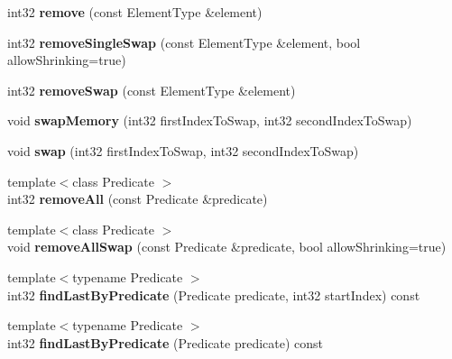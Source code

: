 \begin{DoxyCompactItemize}
int32 {\bfseries remove} (const Element\+Type \&element)
\item 
\mbox{\label{class_arcana_1_1_array_a849750b62acc0b3554d63dc2dbf7f382}} 
int32 {\bfseries remove\+Single\+Swap} (const Element\+Type \&element, bool allow\+Shrinking=true)
\item 
\mbox{\label{class_arcana_1_1_array_af950b1dd843709ce88930dec867e93db}} 
int32 {\bfseries remove\+Swap} (const Element\+Type \&element)
\item 
\mbox{\label{class_arcana_1_1_array_ac42d537277a747961d62b0e591d4391a}} 
void {\bfseries swap\+Memory} (int32 first\+Index\+To\+Swap, int32 second\+Index\+To\+Swap)
\item 
\mbox{\label{class_arcana_1_1_array_a5873c440c62d072d2bef2dec178ac447}} 
void {\bfseries swap} (int32 first\+Index\+To\+Swap, int32 second\+Index\+To\+Swap)
\item 
\mbox{\label{class_arcana_1_1_array_a88d753cbf13d4855581bf4873bbd35e6}} 
{\footnotesize template$<$class Predicate $>$ }\\int32 {\bfseries remove\+All} (const Predicate \&predicate)
\item 
\mbox{\label{class_arcana_1_1_array_a7a1dbc9cdd4b134a23dbb0703c40ed41}} 
{\footnotesize template$<$class Predicate $>$ }\\void {\bfseries remove\+All\+Swap} (const Predicate \&predicate, bool allow\+Shrinking=true)
\item 
\mbox{\label{class_arcana_1_1_array_a797e326ddcdcb23c33903330a7b12266}} 
{\footnotesize template$<$typename Predicate $>$ }\\int32 {\bfseries find\+Last\+By\+Predicate} (Predicate predicate, int32 start\+Index) const
\item 
\mbox{\label{class_arcana_1_1_array_a6feae475b80366538fcb0eefff8b508d}} 
{\footnotesize template$<$typename Predicate $>$ }\\int32 {\bfseries find\+Last\+By\+Predicate} (Predicate predicate) const
\item 

\end{DoxyCompactItemize}
